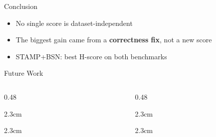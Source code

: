 \documentclass[aspectratio=169,10pt]{beamer}
\begin{document}
\begin{frame}{Conclusion}
  \begin{itemize}
    \setlength\itemsep{4.5mm}
    \item No single score is dataset-independent
    \item The biggest gain came from a \textbf{correctness fix}, not a new score
    \item STAMP+BSN: best H-score on both benchmarks
  \end{itemize}
\end{frame}

\begin{frame}{Future Work}
  \vspace{3mm}
  \begin{columns}[T]
    \begin{column}{0.48\textwidth}
      \begin{cardh}{2.3cm}\footnotesize{}\end{cardh}
      \vspace{2mm}
      \begin{cardh}{2.3cm}\footnotesize{}\end{cardh}
    \end{column}
    \begin{column}{0.48\textwidth}
      \begin{cardh}{2.3cm}\footnotesize{}\end{cardh}
      \vspace{2mm}
      \begin{cardh}{2.3cm}\footnotesize{}\end{cardh}
    \end{column}
  \end{columns}
\end{frame}
\end{document}
